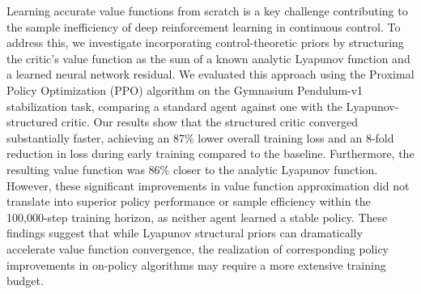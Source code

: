 \documentclass[]{article}
\begin{document}
Learning accurate value functions from scratch is a key challenge contributing to the sample inefficiency of deep reinforcement learning in continuous control. To address this, we investigate incorporating control-theoretic priors by structuring the critic's value function as the sum of a known analytic Lyapunov function and a learned neural network residual. We evaluated this approach using the Proximal Policy Optimization (PPO) algorithm on the Gymnasium Pendulum-v1 stabilization task, comparing a standard agent against one with the Lyapunov-structured critic. Our results show that the structured critic converged substantially faster, achieving an 87\% lower overall training loss and an 8-fold reduction in loss during early training compared to the baseline. Furthermore, the resulting value function was 86\% closer to the analytic Lyapunov function. However, these significant improvements in value function approximation did not translate into superior policy performance or sample efficiency within the 100,000-step training horizon, as neither agent learned a stable policy. These findings suggest that while Lyapunov structural priors can dramatically accelerate value function convergence, the realization of corresponding policy improvements in on-policy algorithms may require a more extensive training budget.
\end{document}
